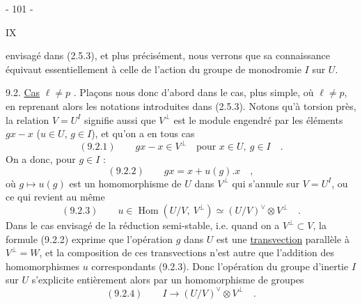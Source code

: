 \begin{center}- 101 -\end{center}\hfill IX

envisagé dans (2.5.3), et plus précisément, nous verrons que sa connaissance équivaut essentiellement à celle de l'action du groupe de monodromie $I$ sur $U$.

9.2. \uline{Cas} $\ell\ne p$ . Plaçons nous donc d'abord dans le cas, plus simple, où $\ell\ne p$, en reprenant alors les notations introduites dans (2.5.3). Notons qu'à torsion près, la relation $V=U^I$ signifie aussi que $V^\perp$ est le module engendré par les éléments $gx-x$ ($u\in U$, $g\in I$), et qu'on a en tous cas
\[
(9.2.1)\qquad gx-x\in V^\perp\quad\text{pour }x\in U,\ g\in I\quad.
\]
On a donc, pour $g\in I$ :
\[
(9.2.2)\qquad gx=x+u(g).x\quad,
\]
où $g\longmapsto u(g)$ est un homomorphisme de $U$ dans $V^\perp$ qui s'annule sur $V=U^I$, ou ce qui revient au même
\[
(9.2.3)\qquad u\in\operatorname{Hom}(U/V,\ V^\perp)\simeq(U/V)^\vee\otimes V^\perp\quad.
\]
Dans le cas envisagé de la réduction semi-stable, i.e. quand on a $V^\perp\subset V$, la formule (9.2.2) exprime que l'opération $g$ dans $U$ est une \uline{transvection} parallèle à $V^\perp=W$, et la composition de ces transvections n'est autre que l'addition des homomorphismes $u$ correspondants (9.2.3). Donc l'opération du groupe d'inertie $I$ sur $U$ s'explicite entièrement alors par un homomorphisme de groupes
\[
(9.2.4)\qquad I\longrightarrow(U/V)^\vee\otimes V^\perp\quad.
\]
\margin{$\longleftarrow$}
